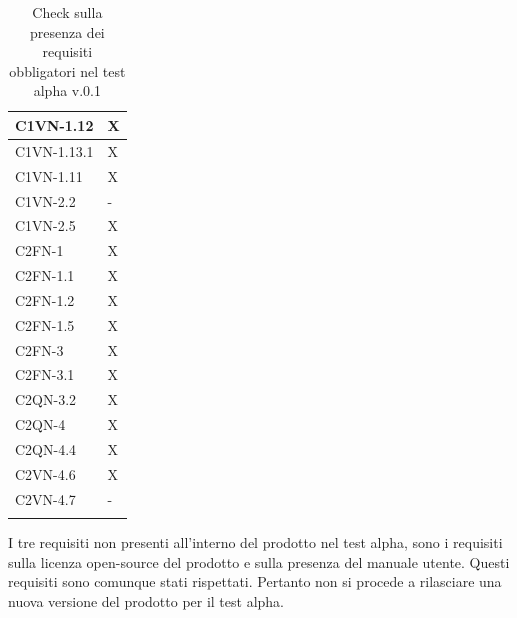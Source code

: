 \begin{footnotesize}
\begin{longtable}{|p{}|p{}|}
 C1VN-1.12&X \\ \hline
 C1VN-1.13.1&X  \\ \hline
 C1VN-1.11&X  \\ \hline
 C1VN-2.2&- \\ \hline
 C1VN-2.5&X  \\ \hline
 C2FN-1&X    \\ \hline
 C2FN-1.1&X    \\ \hline
 C2FN-1.2&X   \\ \hline
 C2FN-1.5&X   \\ \hline
 C2FN-3&X   \\ \hline
 C2FN-3.1&X   \\ \hline
 C2QN-3.2&X   \\ \hline
 C2QN-4 &X  \\ \hline
 C2QN-4.4&X  \\ \hline
 C2VN-4.6&X    \\ \hline
 C2VN-4.7&-  \\ \hline
\caption{Check sulla presenza dei requisiti obbligatori nel test alpha v.0.1}
\end{longtable}
\end{footnotesize}
I tre requisiti non presenti all'interno del prodotto nel test alpha, sono i
requisiti sulla licenza open-source del prodotto e sulla presenza del manuale utente.
Questi requisiti sono comunque stati rispettati. Pertanto non si procede a
rilasciare una nuova versione del prodotto per il test alpha.

